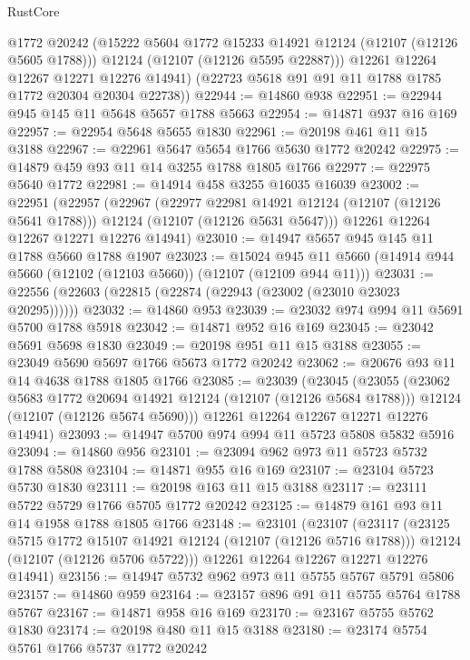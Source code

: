 \begin{lexlean}{RustCore}
\begin{coremodule}
          @1772
          @20242
          (@15222 @5604 @1772 @15233 @14921 @12124 (@12107 (@12126 @5605 @1788)))
          @12124
          (@12107 (@12126 @5595 @22887)))
        @12261
        @12264
        @12267
        @12271
        @12276
        @14941)
      (@22723 @5618 @91 @91 @11 @1788 @1785 @1772 @20304 @20304 @22738))
@22944 := @14860 @938
@22951 := @22944 @945 @145 @11 @5648 @5657 @1788 @5663
@22954 := @14871 @937 @16 @169
@22957 := @22954 @5648 @5655 @1830
@22961 := @20198 @461 @11 @15 @3188
@22967 := @22961 @5647 @5654 @1766 @5630 @1772 @20242
@22975 := @14879 @459 @93 @11 @14 @3255 @1788 @1805 @1766
@22977 := @22975 @5640 @1772
@22981 := @14914 @458 @3255 @16035 @16039
@23002 := @22951
    (@22957
      (@22967
        (@22977 @22981 @14921 @12124 (@12107 (@12126 @5641 @1788)))
        @12124
        (@12107 (@12126 @5631 @5647)))
      @12261
      @12264
      @12267
      @12271
      @12276
      @14941)
@23010 := @14947 @5657 @945 @145 @11 @1788 @5660 @1788 @1907
@23023 := @15024
    @945
    @11
    @5660
    (@14914 @944 @5660 (@12102 (@12103 @5660)) (@12107 (@12109 @944 @11)))
@23031 := @22556 (@22603 (@22815 (@22874 (@22943 (@23002 (@23010 @23023 @20295))))))
@23032 := @14860 @953
@23039 := @23032 @974 @994 @11 @5691 @5700 @1788 @5918
@23042 := @14871 @952 @16 @169
@23045 := @23042 @5691 @5698 @1830
@23049 := @20198 @951 @11 @15 @3188
@23055 := @23049 @5690 @5697 @1766 @5673 @1772 @20242
@23062 := @20676 @93 @11 @14 @4638 @1788 @1805 @1766
@23085 := @23039
    (@23045
      (@23055
        (@23062 @5683 @1772 @20694 @14921 @12124 (@12107 (@12126 @5684 @1788)))
        @12124
        (@12107 (@12126 @5674 @5690)))
      @12261
      @12264
      @12267
      @12271
      @12276
      @14941)
@23093 := @14947 @5700 @974 @994 @11 @5723 @5808 @5832 @5916
@23094 := @14860 @956
@23101 := @23094 @962 @973 @11 @5723 @5732 @1788 @5808
@23104 := @14871 @955 @16 @169
@23107 := @23104 @5723 @5730 @1830
@23111 := @20198 @163 @11 @15 @3188
@23117 := @23111 @5722 @5729 @1766 @5705 @1772 @20242
@23125 := @14879 @161 @93 @11 @14 @1958 @1788 @1805 @1766
@23148 := @23101
    (@23107
      (@23117
        (@23125 @5715 @1772 @15107 @14921 @12124 (@12107 (@12126 @5716 @1788)))
        @12124
        (@12107 (@12126 @5706 @5722)))
      @12261
      @12264
      @12267
      @12271
      @12276
      @14941)
@23156 := @14947 @5732 @962 @973 @11 @5755 @5767 @5791 @5806
@23157 := @14860 @959
@23164 := @23157 @896 @91 @11 @5755 @5764 @1788 @5767
@23167 := @14871 @958 @16 @169
@23170 := @23167 @5755 @5762 @1830
@23174 := @20198 @480 @11 @15 @3188
@23180 := @23174 @5754 @5761 @1766 @5737 @1772 @20242

\end{coremodule}
\end{lexlean}
